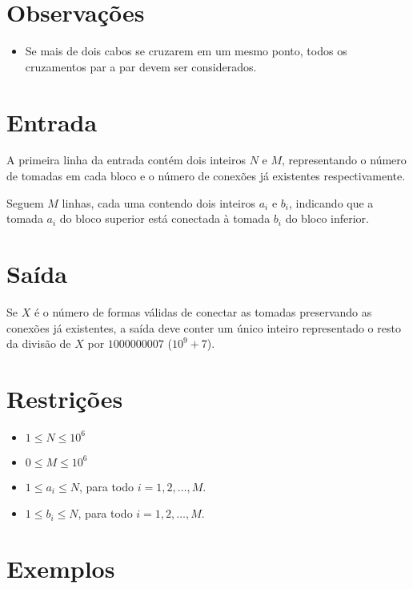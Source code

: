 \section*{Observações}
\begin{itemize}
\item Se mais de dois cabos se cruzarem em um mesmo ponto, todos os cruzamentos par a par devem ser considerados.

\end{itemize}
\section*{Entrada}

A primeira linha da entrada contém dois inteiros $N$ e $M$, representando o número de tomadas em cada bloco e o número de conexões já existentes respectivamente.

Seguem $M$ linhas, cada uma contendo dois inteiros $a_i$ e $b_i$, indicando que a tomada $a_i$ do bloco superior está conectada à tomada $b_i$ do bloco inferior.


\section*{Saída}

Se $X$ é o número de formas válidas de conectar as tomadas preservando as conexões já existentes, a saída deve conter um único inteiro representado o resto da divisão de $X$ por $1000000007$ ($10^9 + 7$).

 
\section*{Restrições}

\begin{itemize}
\item $1 \leq N \leq 10^6$
\item $0 \leq M \leq 10^6$
\item $1 \leq a_i \leq N$, para todo $i=1,2,\ldots,M$.

\item $1 \leq b_i \leq N$, para todo $i=1,2,\ldots,M$.

\end{itemize}
\section*{Exemplos}
\exemplo
